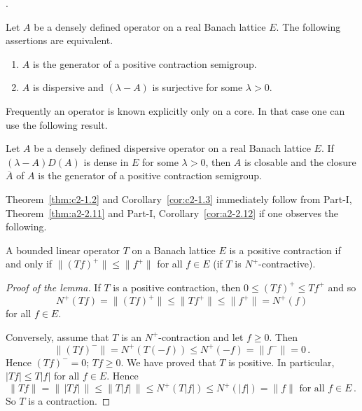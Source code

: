 \textcite{phillips:1962}.
\begin{theorem}\label{thm:c2-1.2}
%
%
Let $A$ be a densely defined operator on a real Banach lattice $E$. 
The following assertions are equivalent.
\begin{enumerate}[\upshape (a)]
\item \label{thm:c2-1.2-1}
$A$ is the generator of a positive contraction semigroup.
\item \label{thm:c2-1.2-2}
$A$ is dispersive and $(\lambda-A)$ is surjective for some $\lambda > 0$.
\end{enumerate}
\end{theorem}
Frequently an operator is known explicitly only on a core. In that case one can use the following result.
\begin{corollary}\label{cor:c2-1.3}
%
Let $A$ be a densely defined dispersive operator on a real Banach lattice $E$. 
If\/ $(\lambda - A)D(A)$ is dense in $E$ for some $\lambda > 0$, then $A$ is closable and the closure $\overline{A}$ of\/ $A$ is the generator of a positive contraction semigroup.
\end{corollary}
Theorem~\ref{thm:c2-1.2}  and Corollary~\ref{cor:c2-1.3}  immediately follow from Part-I, Theorem~\ref{thm:a2-2.11} and Part-I, Corollary~\ref{cor:a2-2.12}  if one observes the following.
\begin{lemma}\label{lem:c2-1.4}
%
A bounded linear operator  $T$ on a Banach lattice $E$ is a positive contraction if and only if\/ $\|(Tf)^{+}\| \leq \|f^{+}\|$ for all $f \in E$ (\ie if\/ $T$ is $N^{+}$-contractive).
\end{lemma}
\begin{proof}[Proof of the lemma]
If\/ $T$ is a positive contraction, then $0 \leq (Tf)^{+} \leq Tf^{+}$ and so 
%
\[
	N^{+}(Tf) = \|(Tf)^{+}\| \leq \|Tf^{+}\| \leq \|f^{+}\| = N^{+}(f)
\]
%
for all $f \in E$. 

Conversely, assume that $T$ is an $N^{+}$-contraction and let $f \geq 0$. 
Then 
\[
\|(Tf)^{-}\| = N^{+}(T(-f)) \leq N^{+}(-f) = \|f^{-}\| = 0\,.
\]
Hence $(Tf)^{-} = 0$; \ie $Tf \geq 0$. 
We have proved that $T$ is positive. 
In particular, $|Tf| \leq T|f|$ for all $f \in E$. 
Hence 
\[
\|Tf\| = \|\,|Tf|\,\| \leq \|T|f|\,\| \leq N^{+}(T|f|) \leq N^{+}(|f|) = \|f\| \text{ for all } f \in E\,.
\]
So $T$ is a contraction.
\end{proof}
